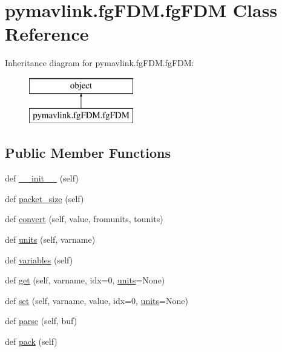 \hypertarget{classpymavlink_1_1fgFDM_1_1fgFDM}{}\section{pymavlink.\+fg\+F\+D\+M.\+fg\+F\+DM Class Reference}
\label{classpymavlink_1_1fgFDM_1_1fgFDM}
Inheritance diagram for pymavlink.\+fg\+F\+D\+M.\+fg\+F\+DM\+:\begin{figure}[H]
\begin{center}
\leavevmode
\includegraphics[height=2.000000cm]{classpymavlink_1_1fgFDM_1_1fgFDM}
\end{center}
\end{figure}
\subsection*{Public Member Functions}
\begin{DoxyCompactItemize}
\item 
def \hyperlink{classpymavlink_1_1fgFDM_1_1fgFDM_ac2108e870de5be20a8352a314358391c}{\+\_\+\+\_\+init\+\_\+\+\_\+} (self)
\item 
def \hyperlink{classpymavlink_1_1fgFDM_1_1fgFDM_ad993e23d6056391321aad8c6d4212d74}{packet\+\_\+size} (self)
\item 
def \hyperlink{classpymavlink_1_1fgFDM_1_1fgFDM_a3b8200822cb649c87cda6d625a168871}{convert} (self, value, fromunits, tounits)
\item 
def \hyperlink{classpymavlink_1_1fgFDM_1_1fgFDM_a57c41f1b87ecb4bff8d40e63cf7ba6d5}{units} (self, varname)
\item 
def \hyperlink{classpymavlink_1_1fgFDM_1_1fgFDM_ae0756cde090c7a8a0cf9c08a6cbd700e}{variables} (self)
\item 
def \hyperlink{classpymavlink_1_1fgFDM_1_1fgFDM_a0d1625275f9a8c52f3b11bd403b29c4a}{get} (self, varname, idx=0, \hyperlink{classpymavlink_1_1fgFDM_1_1fgFDM_a57c41f1b87ecb4bff8d40e63cf7ba6d5}{units}=None)
\item 
def \hyperlink{classpymavlink_1_1fgFDM_1_1fgFDM_a850f093cb48104e97a5176e79390ac85}{set} (self, varname, value, idx=0, \hyperlink{classpymavlink_1_1fgFDM_1_1fgFDM_a57c41f1b87ecb4bff8d40e63cf7ba6d5}{units}=None)
\item 
def \hyperlink{classpymavlink_1_1fgFDM_1_1fgFDM_a706a022185739c6b22a0e5ccdaedf886}{parse} (self, buf)
\item 
def \hyperlink{classpymavlink_1_1fgFDM_1_1fgFDM_aafa38ce5a7b2976d4ad3ef0d2615df89}{pack} (self)
\end{DoxyCompactItemize}
